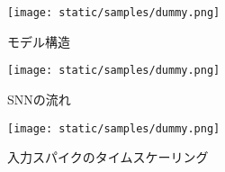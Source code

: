 
\begin{figure*}[htbp]
    \centering

    \parbox{.9 \linewidth}{
        \centering
        \texttt{[image: static/samples/dummy.png]}
        \caption{モデル構造}
        \label{sec2:fig:model}
    }
    
    \vspace{1em} %

    \parbox{.45\linewidth}{
        \centering
        \texttt{[image: static/samples/dummy.png]}
        \caption{SNNの流れ}
        \label{sec2:fig:snn}
    }
    \parbox{.45\linewidth}{
        \centering
        \texttt{[image: static/samples/dummy.png]}
        \caption{入力スパイクのタイムスケーリング}
        \label{sec2:fig:inspike}
    }
\end{figure*}
